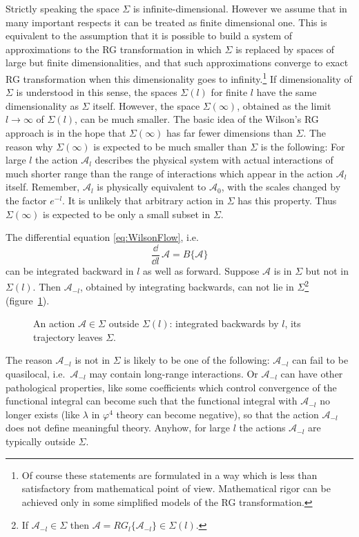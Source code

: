 Strictly speaking the space $\Sigma$ is infinite-dimensional. However we assume
that in many important respects it can be treated as finite dimensional one. This
is equivalent to the assumption that it is possible to build a system of
approximations to the RG transformation in which $\Sigma$ is replaced by spaces of
large but finite dimensionalities, and that such approximations converge to exact
RG transformation when this dimensionality goes to infinity.\footnote{Of course
these statements are formulated in a way which is less than satisfactory from
mathematical point of view. Mathematical rigor can be achieved only in some
simplified models of the RG transformation.} If dimensionality of $\Sigma$ is
understood in this sense, the spaces $\Sigma(l)$ for finite $l$ have the same
dimensionality as $\Sigma$ itself. However, the space $\Sigma(\infty)$, obtained
as the limit $l\to\infty$ of $\Sigma(l)$, can be much smaller. The basic idea of
the Wilson's RG approach is in the hope that $\Sigma(\infty)$ has far fewer
dimensions than $\Sigma$. The reason why $\Sigma(\infty)$ is expected to be much
smaller than $\Sigma$ is the following: For large $l$ the action $\mathcal A_l$
describes the physical system with actual interactions of much shorter range than
the range of interactions which appear in the action $\mathcal A_l$ itself.
Remember, $\mathcal A_l$ is physically equivalent to $\mathcal A_0$, with the
scales changed by the factor $e^{-l}$. It is unlikely that arbitrary action in
$\Sigma$ has this property. Thus $\Sigma(\infty)$ is expected to be only a small
subset in $\Sigma$.

The differential equation \eqref{eq:WilsonFlow}, i.e.
\[
\frac{\dd}{\dd l}\,\mathcal A=B\{\mathcal A\}
\]
can be integrated backward in $l$ as well as forward. Suppose $\mathcal A$ is in
$\Sigma$ but not in $\Sigma(l)$. Then $\mathcal A_{-l}$, obtained by integrating
backwards, can not lie in $\Sigma$\footnote{If $\mathcal A_{-l}\in\Sigma$ then
$\mathcal A=RG_l\{\mathcal A_{-l}\}\in\Sigma(l)$.} (figure~\ref{fig:backward}).
\begin{figure}[ht]
\centering{}
\caption{An action $\mathcal A\in\Sigma$ outside $\Sigma(l)$: integrated backwards
by $l$, its trajectory leaves $\Sigma$.}
\label{fig:backward}
\end{figure}

The reason $\mathcal A_{-l}$ is not in $\Sigma$ is likely to be one of the
following: $\mathcal A_{-l}$ can fail to be quasilocal, i.e.\ $\mathcal A_{-l}$
may contain long-range interactions. Or $\mathcal A_{-l}$ can have other
pathological properties, like some coefficients which control convergence of the
functional integral can become such that the functional integral with
$\mathcal A_{-l}$ no longer exists (like $\lambda$ in $\varphi^4$ theory can
become negative), so that the action $\mathcal A_{-l}$ does not define meaningful
theory. Anyhow, for large $l$ the actions $\mathcal A_{-l}$ are typically outside
$\Sigma$.

